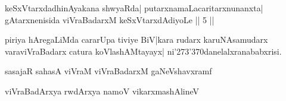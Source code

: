 \begin{entry}
\begin{shl}
keSxVtarxdadhinAyakana shwyaRda| putarxnamaLacaritarxnunanxta|\\
gAtarxnenisida viVraBadarxM keSxVtarxdAdiyoLe || 5 ||
\end{shl}
\begin{shl}
piriya hAregaLiMda cararUpa tiviye BiV|kara rudarx karuNA\-samudarx\\
varaviVraBadarx catura koVlashAMtayayx| ni\char'273\char'370danelalxranababxrisi.
\end{shl}
\gl{}
\begin{shl}
sasajaR sahasA viVraM viVraBadarxM gaNeVshavxramf
\end{shl}
\gl{}
\begin{shl}
viVraBadArxya rwdArxya namoV vikarxmashAlineV
\end{shl}
\end{entry}

